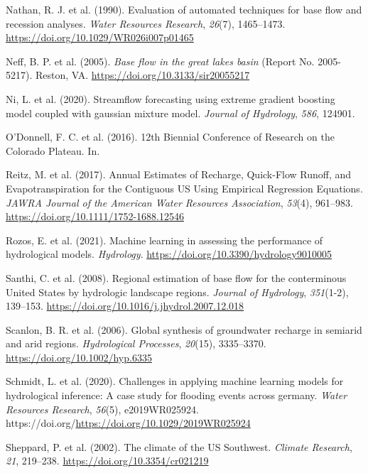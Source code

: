 \documentclass[
]{agujournal2019}
\newlength{\cslhangindent}
\newenvironment{CSLReferences}[2] %
 {\begin{list}{}{%
  \setlength{\itemindent}{0pt}
  \setlength{\leftmargin}{0pt}
  \setlength{\parsep}{0pt}
  \ifodd #1
   \setlength{\leftmargin}{\cslhangindent}
   \setlength{\itemindent}{-1\cslhangindent}
  \fi
  \setlength{\itemsep}{#2\baselineskip}}}
 {\end{list}}
\begin{document}
\begin{CSLReferences}{1}{0}
Nathan, R. J. et al. (1990). Evaluation of automated techniques for base
flow and recession analyses. \emph{Water Resources Research},
\emph{26}(7), 1465--1473. \url{https://doi.org/10.1029/WR026i007p01465}

Neff, B. P. et al. (2005). \emph{Base flow in the great lakes basin}
(Report No. 2005-5217). Reston, VA.
\url{https://doi.org/10.3133/sir20055217}

Ni, L. et al. (2020). Streamflow forecasting using extreme gradient
boosting model coupled with gaussian mixture model. \emph{Journal of
Hydrology}, \emph{586}, 124901.

O'Donnell, F. C. et al. (2016). 12th Biennial Conference of Research on
the Colorado Plateau. In.

Reitz, M. et al. (2017). Annual Estimates of Recharge, Quick{-}Flow
Runoff, and Evapotranspiration for the Contiguous US Using Empirical
Regression Equations. \emph{JAWRA Journal of the American Water
Resources Association}, \emph{53}(4), 961--983.
\url{https://doi.org/10.1111/1752-1688.12546}

Rozos, E. et al. (2021). Machine learning in assessing the performance
of hydrological models. \emph{Hydrology}.
\url{https://doi.org/10.3390/hydrology9010005}

Santhi, C. et al. (2008). Regional estimation of base flow for the
conterminous United States by hydrologic landscape regions.
\emph{Journal of Hydrology}, \emph{351}(1-2), 139--153.
\url{https://doi.org/10.1016/j.jhydrol.2007.12.018}

Scanlon, B. R. et al. (2006). Global synthesis of groundwater recharge
in semiarid and arid regions. \emph{Hydrological Processes},
\emph{20}(15), 3335--3370. \url{https://doi.org/10.1002/hyp.6335}

Schmidt, L. et al. (2020). Challenges in applying machine learning
models for hydrological inference: A case study for flooding events
across germany. \emph{Water Resources Research}, \emph{56}(5),
e2019WR025924.
https://doi.org/\url{https://doi.org/10.1029/2019WR025924}

Sheppard, P. et al. (2002). The climate of the US Southwest.
\emph{Climate Research}, \emph{21}, 219--238.
\url{https://doi.org/10.3354/cr021219}


\end{CSLReferences}
\end{document}
